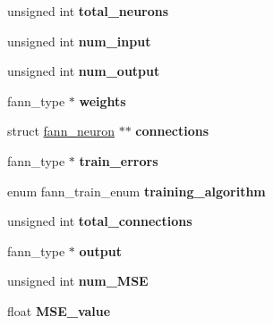 \begin{DoxyCompactItemize}
\item 
\hypertarget{structfann_a6cc359d0457fa55c1c7691a7ea9e024b}{unsigned int {\bfseries total\-\_\-neurons}}\label{structfann_a6cc359d0457fa55c1c7691a7ea9e024b}

\item 
\hypertarget{structfann_ac3550a2f70842a7cc82b298046f8dc8a}{unsigned int {\bfseries num\-\_\-input}}\label{structfann_ac3550a2f70842a7cc82b298046f8dc8a}

\item 
\hypertarget{structfann_ae9c0749c170ed297771c94f797bc232f}{unsigned int {\bfseries num\-\_\-output}}\label{structfann_ae9c0749c170ed297771c94f797bc232f}

\item 
\hypertarget{structfann_a6d2e5ebc02e10c62843533743c9e814b}{fann\-\_\-type $\ast$ {\bfseries weights}}\label{structfann_a6d2e5ebc02e10c62843533743c9e814b}

\item 
\hypertarget{structfann_a9f6335b0a3fb05241f28e9d862854150}{struct \hyperlink{structfann__neuron}{fann\-\_\-neuron} $\ast$$\ast$ {\bfseries connections}}\label{structfann_a9f6335b0a3fb05241f28e9d862854150}

\item 
\hypertarget{structfann_af9272624a5028af5b57519c732bb462d}{fann\-\_\-type $\ast$ {\bfseries train\-\_\-errors}}\label{structfann_af9272624a5028af5b57519c732bb462d}

\item 
\hypertarget{structfann_ad81c85e9abca8e3a331f2e270815a8d9}{enum fann\-\_\-train\-\_\-enum {\bfseries training\-\_\-algorithm}}\label{structfann_ad81c85e9abca8e3a331f2e270815a8d9}

\item 
\hypertarget{structfann_a25124fd61579fb1225a38bb30b4470a2}{unsigned int {\bfseries total\-\_\-connections}}\label{structfann_a25124fd61579fb1225a38bb30b4470a2}

\item 
\hypertarget{structfann_a4a60b0064998791aeb1d094b8a8c7feb}{fann\-\_\-type $\ast$ {\bfseries output}}\label{structfann_a4a60b0064998791aeb1d094b8a8c7feb}

\item 
\hypertarget{structfann_a0ce9d94d0ace6088ee7be452c186034a}{unsigned int {\bfseries num\-\_\-\-M\-S\-E}}\label{structfann_a0ce9d94d0ace6088ee7be452c186034a}

\item 
\hypertarget{structfann_a7971872c47326f80b15fd92ea1cb8afc}{float {\bfseries M\-S\-E\-\_\-value}}\label{structfann_a7971872c47326f80b15fd92ea1cb8afc}


\end{DoxyCompactItemize}
